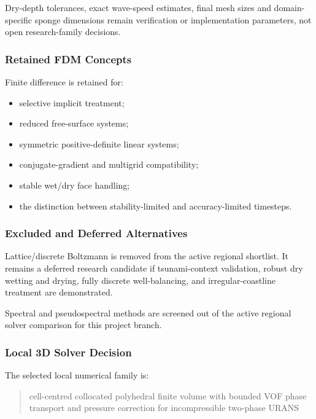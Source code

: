 Dry-depth tolerances, exact wave-speed estimates, final mesh sizes and
domain-specific sponge dimensions remain verification or implementation
parameters, not open research-family decisions.

\subsubsection{Retained FDM Concepts}
\label{sec:res-num-frm-retained-fdm-concepts}

Finite difference is retained for:

\begin{itemize}
  \item selective implicit treatment;
  \item reduced free-surface systems;
  \item symmetric positive-definite linear systems;
  \item conjugate-gradient and multigrid compatibility;
  \item stable wet/dry face handling;
  \item the distinction between stability-limited and accuracy-limited
    timesteps.
\end{itemize}

\subsubsection{Excluded and Deferred Alternatives}
\label{sec:res-num-frm-excluded-deferred-alternatives}

Lattice/discrete Boltzmann is removed from the active regional
shortlist. It remains a deferred research candidate if tsunami-context
validation, robust dry wetting and drying, fully discrete
well-balancing, and irregular-coastline treatment are demonstrated.

Spectral and pseudospectral methods are screened out of the active
regional solver comparison for this project branch.

\subsubsection{Local 3D Solver Decision}
\label{sec:res-num-frm-local-solver-decision}

The selected local numerical family is:

\begin{quote}
  cell-centred collocated polyhedral finite volume with bounded VOF
  phase transport and pressure correction for incompressible
  two-phase URANS
\end{quote}

